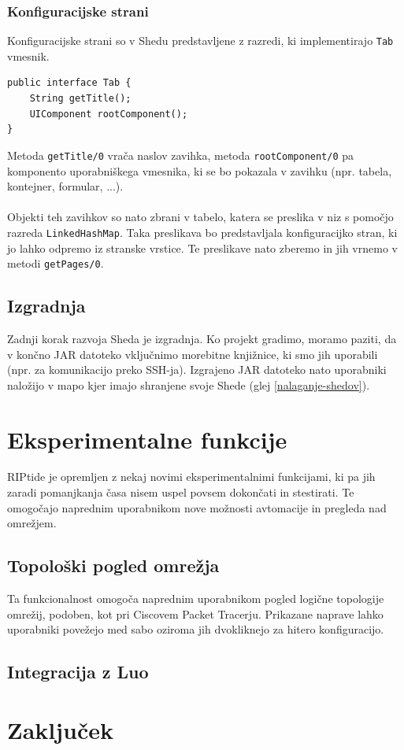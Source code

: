 \documentclass[12pt]{article}
\begin{document}
\subsubsection{Konfiguracijske strani} \label{konfiguracijske-strani}
Konfiguracijske strani so v Shedu predstavljene z razredi, ki
implementirajo \texttt{Tab} vmesnik.

\begin{lstlisting}[style=JavaStyle]
public interface Tab {
	String getTitle();
	UIComponent rootComponent();
}
\end{lstlisting}
Metoda \texttt{getTitle/0} vrača naslov zavihka, metoda
\texttt{rootComponent/0} pa komponento uporabniškega vmesnika, ki se bo
pokazala v zavihku (npr. tabela, kontejner, formular, ...).
\\\\
Objekti teh zavihkov so nato zbrani v tabelo, katera se preslika v niz s
pomočjo razreda \texttt{LinkedHashMap}. Taka preslikava bo predstavljala
konfiguracijko stran, ki jo lahko odpremo iz stranske vrstice. Te
preslikave nato zberemo in jih vrnemo v metodi \texttt{getPages/0}.
\newpage

\subsection{Izgradnja}
Zadnji korak razvoja Sheda je izgradnja. Ko projekt gradimo, moramo paziti,
da v končno JAR datoteko vključnimo morebitne knjižnice, ki smo jih
uporabili (npr. za komunikacijo preko SSH-ja). Izgrajeno JAR datoteko nato
uporabniki naložijo v mapo kjer imajo shranjene svoje Shede
(glej \ref{nalaganje-shedov}).
\newpage

\section{Eksperimentalne funkcije}
RIPtide je opremljen z nekaj novimi eksperimentalnimi funkcijami,
ki pa jih zaradi pomanjkanja časa nisem uspel povsem dokončati in
stestirati. Te omogočajo naprednim uporabnikom nove možnosti avtomacije
in pregleda nad omrežjem.

\subsection{Topološki pogled omrežja}
Ta funkcionalnost omogoča naprednim uporabnikom pogled logične topologije
omrežij, podoben, kot pri Ciscovem Packet Tracerju. Prikazane naprave
lahko uporabniki povežejo med sabo oziroma jih dvokliknejo za hitero
konfiguracijo.

\subsection{Integracija z Luo}

\newpage

\section{Zaključek}
\newpage
\end{document}
